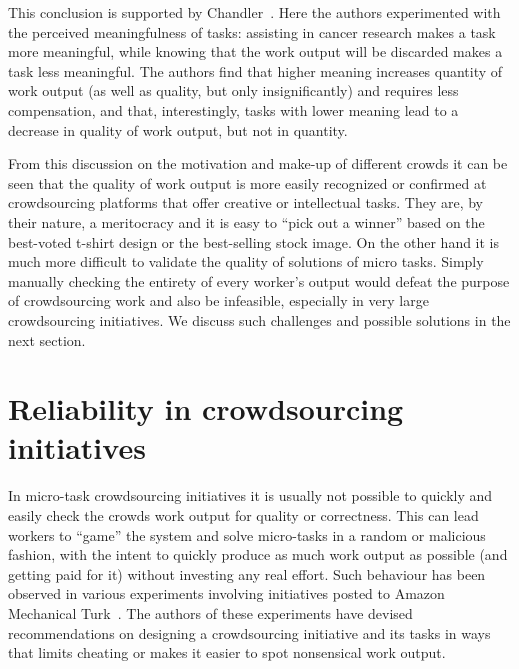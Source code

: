 \documentclass{sig-alternate}
\begin{document}
This conclusion is supported by Chandler~\cite{chandler2013breaking}. Here the
authors experimented with the perceived meaningfulness of tasks: assisting in
cancer research makes a task more meaningful, while knowing that the work
output will be discarded makes a task less meaningful. The authors find that
higher meaning increases quantity of work output (as well as quality, but only
insignificantly) and requires less compensation, and that, interestingly, tasks
with lower meaning lead to a decrease in quality of work output, but not in
quantity. 

From this discussion on the motivation and make-up of different crowds it can
be seen that the quality of work output is more easily recognized or confirmed
at crowdsourcing platforms that offer creative or intellectual tasks. They are,
by their nature, a meritocracy and it is easy to ``pick out a winner'' based on
the best-voted t-shirt design or the best-selling stock image. On the other
hand it is much more difficult to validate the quality of solutions of micro
tasks. Simply manually checking the entirety of every worker's output would
defeat the purpose of crowdsourcing work and also be infeasible, especially in
very large crowdsourcing initiatives. We discuss such challenges and possible
solutions in the next section.


\section{Reliability in crowdsourcing initiatives}

In micro-task crowdsourcing initiatives it is usually not possible to quickly
and easily check the crowds work output for quality or correctness. This can
lead workers to ``game'' the system and solve micro-tasks in a random or
malicious fashion, with the intent to quickly produce as much work output as
possible (and getting paid for it) without investing any real effort. Such
behaviour has been observed in various experiments involving initiatives posted
to Amazon Mechanical Turk~\cite{hossfeld2013crowdtesting,
	kittur2008crowdsourcing, redi2013crowdsourcing}. The authors of these
experiments have devised recommendations on designing a crowdsourcing
initiative and its tasks in ways that limits cheating or makes it easier to
spot nonsensical work output.
\end{document}
